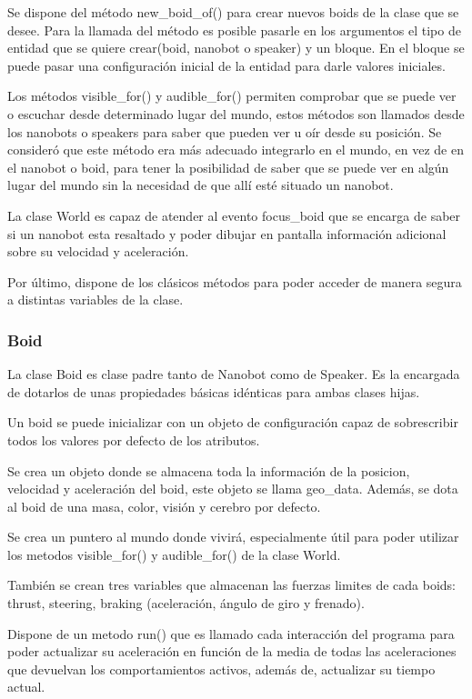 Se dispone del método new\_boid\_of() para crear nuevos boids de la clase que se desee. Para la llamada del método es posible pasarle en los argumentos el tipo de entidad que se quiere crear(boid, nanobot o speaker) y un bloque. En el bloque se puede pasar una configuración inicial de la entidad para darle valores iniciales.

Los métodos visible\_for() y audible\_for() permiten comprobar que se puede ver o escuchar desde determinado lugar del mundo, estos métodos son llamados desde los nanobots o speakers para saber que pueden ver u oír desde su posición. Se consideró que este método era más adecuado integrarlo en el mundo, en vez de en el nanobot o boid, para tener la posibilidad de saber que se puede ver en algún lugar del mundo sin la necesidad de que allí esté situado un nanobot.

La clase World es capaz de atender al evento focus\_boid que se encarga de saber si un nanobot esta resaltado y poder dibujar en pantalla información adicional sobre su velocidad y aceleración.

Por último, dispone de los clásicos métodos para poder acceder de manera segura a distintas variables de la clase.

\subsubsection{Boid}
\label{sec:boid}
La clase Boid es clase padre tanto de Nanobot como de Speaker. Es la encargada de dotarlos de unas propiedades básicas idénticas para ambas clases hijas.
 
Un boid se puede inicializar con un objeto de configuración capaz de sobrescribir todos los  valores por defecto de los atributos.

Se crea un objeto donde se almacena toda la información de la posicion, velocidad y aceleración del boid, este objeto se llama geo\_data. Además, se dota al boid de una masa, color, visión y cerebro por defecto.
 
Se crea un puntero al mundo donde vivirá, especialmente útil para poder utilizar los metodos visible\_for() y audible\_for() de la clase World.

También se crean tres variables que almacenan las fuerzas limites de cada boids: thrust, steering, braking (aceleración, ángulo de giro y frenado).
 
Dispone de un metodo run() que es llamado cada interacción del programa para poder actualizar su aceleración en función de la media de todas las aceleraciones que devuelvan los comportamientos activos, además de, actualizar su tiempo actual.
 
